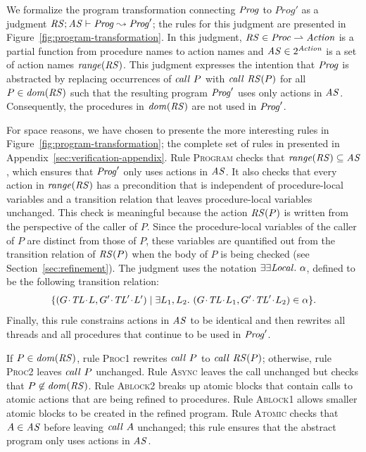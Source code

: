 We formalize the program transformation connecting $\mathit{Prog}$ to $Prog'$ as a judgment
$\mathit{RS};\mathit{AS} \vdash \mathit{Prog} \leadsto \mathit{Prog}'$;
the rules for this judgment are presented in Figure~\ref{fig:program-transformation}.
In this judgment,
$\mathit{RS} \in \mathit{Proc} \rightharpoonup \mathit{Action}$ is a partial function from procedure names to action names
and $\mathit{AS} \in 2^{\mathit{Action}}$ is a set of action names $\mathit{range}(\mathit{RS})$.
This judgment expresses the intention that $\mathit{Prog}$ is abstracted by replacing
occurrences of $\mathit{call}\ P$ with $\mathit{call}\ \mathit{RS}(P)$ for all $P \in \mathit{dom}(\mathit{RS})$ such that 
the resulting program $\mathit{Prog}'$ uses only actions in $\mathit{AS}$.
Consequently, the procedures in $\mathit{dom}(\mathit{RS})$ are not used in $\mathit{Prog}'$.

For space reasons, we have chosen to presente the more interesting rules in Figure~\ref{fig:program-transformation};
the complete set of rules in presented in Appendix~\ref{sec:verification-appendix}.
Rule \textsc{Program} checks that $\mathit{range}(\mathit{RS}) \subseteq \mathit{AS}$,
which ensures that $\mathit{Prog}'$ only uses actions in $\mathit{AS}$.
It also checks that every action in $\mathit{range}(\mathit{RS})$ has a precondition 
that is independent of procedure-local variables and a transition relation that leaves 
procedure-local variables unchanged.  
This check is meaningful because the action $\mathit{RS}(P)$ is written from the 
perspective of the caller of $P$.
Since the procedure-local variables of the caller of $P$ are distinct from those of $P$,
these variables are quantified out from the transition relation of $\mathit{RS}(P)$ when 
the body of $P$ is being checked (see Section~\ref{sec:refinement}).
The judgment uses the notation $\exists\exists {\mathit{Local}}.\ \alpha$, defined to be the following transition relation:
\[\{(\MakeStore{\varsG}{\varsTL}{\varsL}, \MakeStore{\varsG'}{\varsTL'}{\varsL'}) \mid \exists \varsL_1,\varsL_2.\ (\MakeStore{\varsG}{\varsTL}{\varsL_1}, \MakeStore{\varsG'}{\varsTL'}{\varsL_2}) \in \alpha \}.\]
Finally, this rule constrains actions in $\mathit{AS}$ to be identical and then rewrites all threads
and all procedures that continue to be used in $\mathit{Prog}'$.

If $P \in \mathit{dom}(\mathit{RS})$, rule \textsc{Proc1} rewrites $\mathit{call}\ P$ to $\mathit{call}\ \mathit{RS}(P)$;
otherwise, rule \textsc{Proc2} leaves $\mathit{call}\ P$ unchanged.
Rule \textsc{Async} leaves the call unchanged but checks that $P \not \in \mathit{dom}(\mathit{RS})$.
Rule \textsc{Ablock2} breaks up atomic blocks that contain calls
to atomic actions that are being refined to procedures.
Rule \textsc{Ablock1} allows smaller atomic blocks to be created in the refined program.
Rule \textsc{Atomic} checks that $A \in \mathit{AS}$ before leaving $\mathit{call}\ A$ unchanged;
this rule ensures that the abstract program only uses actions in $\mathit{AS}$.


